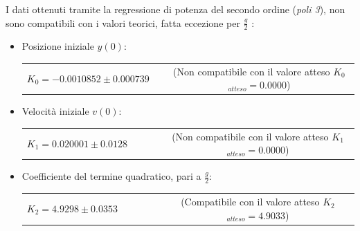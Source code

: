 \documentclass[12pt, a4paper]{article}
\begin{document}
I dati ottenuti tramite la regressione di potenza del secondo ordine (\textit{poli 3}), non sono compatibili con i valori teorici, fatta eccezione per $\displaystyle{\frac{g}{2}}$ :


\renewcommand{\theenumii}{\roman{enumii}}  
\begin{itemize}
    \itemsep0em 
        \item Posizione iniziale $y(0)$:\\
        \begin{tabular}{ccc}
        {$K_0 = -0.0010852 \pm 0.000739$} & & \small{(Non compatibile con il valore atteso $K_{0}$ $_{atteso}= 0.0000$)}  \\
        \end{tabular}
        
    \end{itemize}
    \begin{itemize}
        \item Velocità iniziale $v(0)$:\\
        \begin{tabular}{ccccc}
        {$K_1 =  0.020001 \pm 0.0128$} & & & & \small{(Non compatibile con il valore atteso $K_{1}$ $_{atteso} = 0.0000$)}\\
        \end{tabular}
        
    \end{itemize}
      \begin{itemize}
          \item Coefficiente del termine quadratico, pari a $\displaystyle{\frac{g}{2}}$:\\ 
          \begin{tabular}{cccccc}
              {$K_2 =  4.9298 \pm 0.0353$} & & & & &\small{(Compatibile con il valore atteso $K_{2}$ $_{atteso}= 4.9033$)}\\
          \end{tabular}
         
      \end{itemize}
        
        
\newpage
\end{document}

